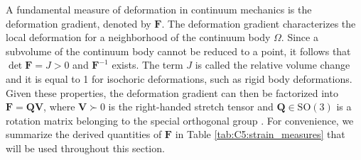 \begin{intermez}
\vspace{-3mm}
A fundamental measure of deformation in continuum mechanics is the deformation gradient, denoted by $\mathbf{F}$. The deformation gradient characterizes the local deformation for a neighborhood of the continuum body $\Omega$. Since a subvolume of the continuum body cannot be reduced to a point, it follows that $\det{\mathbf{F}} = J > 0$ and $\mathbf{F}^{-1}$ exists. The term $J$ is called the relative volume change and it is equal to 1 for isochoric deformations, such as rigid body deformations. Given these properties, the deformation gradient can then be factorized into $\mathbf{F} = \mathbf{Q} \mathbf{V}$, where $\mathbf{V} \succ 0$ is the right-handed stretch tensor and $\mathbf{Q} \in \mathrm{SO}(3)$ is a rotation matrix belonging to the special orthogonal group \cite{Holzapfel2002,Kim2018,Smith2018}. For convenience, we summarize the derived quantities of $\mathbf{F}$ in Table \ref{tab:C5:strain_measures} that will be used throughout this section. \\
\end{intermez}

